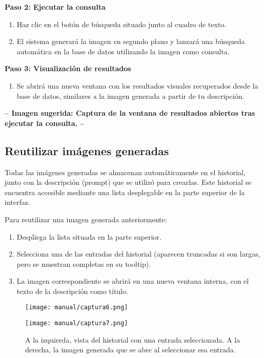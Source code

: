 \textbf{Paso 2: Ejecutar la consulta}
\begin{enumerate}
    \item Haz clic en el botón de búsqueda situado junto al cuadro de texto.
    \item El sistema generará la imagen en segundo plano y lanzará una búsqueda automática en la base de datos utilizando la imagen como consulta.
\end{enumerate}

\textbf{Paso 3: Visualización de resultados}
\begin{enumerate}
    \item Se abrirá una nueva ventana con los resultados visuales recuperados desde la base de datos, similares a la imagen generada a partir de tu descripción.
\end{enumerate}

\textbf{-- Imagen sugerida: Captura de la ventana de resultados abiertos tras ejecutar la consulta. --}


\subsection{Reutilizar imágenes generadas}
Todas las imágenes generadas se almacenan automáticamente en el historial, junto con la descripción (prompt) que se utilizó para crearlas. Este historial se encuentra accesible mediante una lista desplegable en la parte superior de la interfaz.

Para reutilizar una imagen generada anteriormente:
\begin{enumerate}
    \item Despliega la lista situada en la parte superior.
    \item Selecciona una de las entradas del historial (aparecen truncadas si son largas, pero se muestran completas en su tooltip).
    \item La imagen correspondiente se abrirá en una nueva ventana interna, con el texto de la descripción como título.
\end{enumerate}

\begin{figure}[H]
    \centering
    \begin{minipage}[t]{0.48\textwidth}
        \centering
        \texttt{[image: manual/captura6.png]}
    \end{minipage}
    \hfill
    \begin{minipage}[t]{0.48\textwidth}
        \centering
        \texttt{[image: manual/captura7.png]}
    \end{minipage}
    \caption{A la izquierda, vista del historial con una entrada seleccionada. A la derecha, la imagen generada que se abre al seleccionar esa entrada.}
    \label{fig:historial}
\end{figure}


